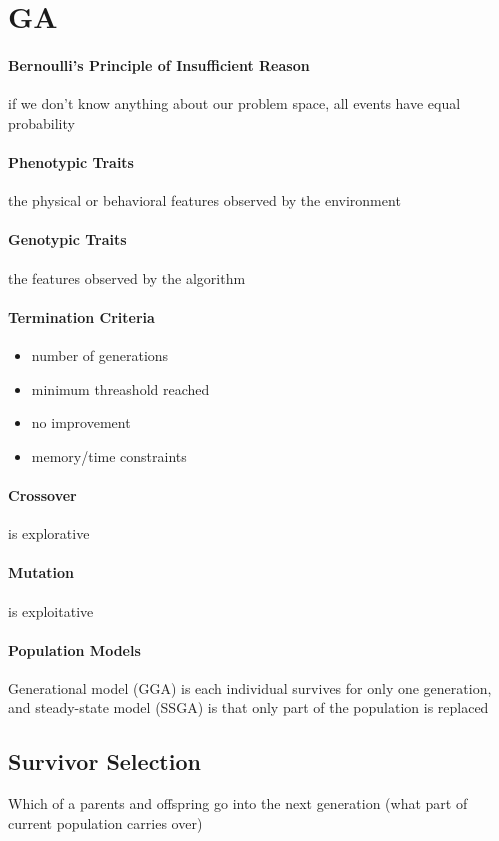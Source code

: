 \documentclass[12pt]{article}
\begin{document}
\section*{GA}
\paragraph{Bernoulli's Principle of Insufficient Reason} 
if we don't know anything about our problem space, all events have equal probability

\paragraph{Phenotypic Traits} 
the physical or behavioral features observed by the environment

\paragraph{Genotypic Traits} 
the features observed by the algorithm

\paragraph{Termination Criteria} 
\begin{itemize}
	\item number of generations
	\item minimum threashold reached
	\item no improvement
	\item memory/time constraints
\end{itemize}

\paragraph{Crossover} 
is explorative

\paragraph{Mutation} 
is exploitative


\paragraph{Population Models} 
Generational model (GGA) is each individual survives for only one generation, and steady-state model (SSGA) is that only part of the population is replaced

\subsection*{Survivor Selection}
Which of a parents and offspring go into the next generation (what part of current population carries over)
\end{document}
